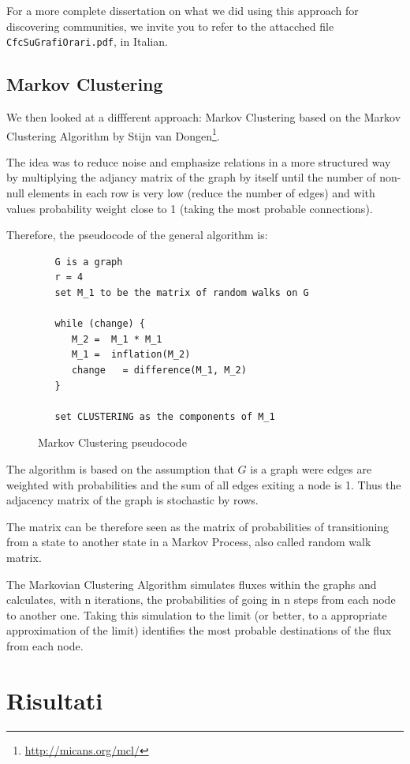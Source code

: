 \documentclass[12pt,a4paper]{article}
\begin{document}
For a more complete dissertation on what we did using this approach for discovering communities, we invite you to refer to the attacched file \texttt{CfcSuGrafiOrari.pdf}, in Italian.

\subsection{Markov Clustering}

We then looked at a diffferent approach: Markov Clustering based on the Markov Clustering Algorithm by Stijn van Dongen\footnote{\url{http://micans.org/mcl/}}.

The idea was to reduce noise and emphasize relations in a more structured way
by multiplying the adjancy matrix of the graph by itself until the number of
non-null elements in each row is very low (reduce the number of edges) and with
values probability weight close to 1 (taking the most probable connections).

Therefore, the pseudocode of the general algorithm is:
\begin{figure}
\begin{verbatim}
   G is a graph
   r = 4
   set M_1 to be the matrix of random walks on G

   while (change) {
      M_2 =  M_1 * M_1
      M_1 =  inflation(M_2)
      change   = difference(M_1, M_2)
   }

   set CLUSTERING as the components of M_1
\end{verbatim}
\caption{Markov Clustering pseudocode}
\end{figure}

The algorithm is based on the assumption that $G$ is a graph
were edges are weighted with probabilities and the sum
of all edges exiting a node is 1. Thus the adjacency matrix
of the graph is stochastic by rows.

The matrix can be therefore seen as the matrix of probabilities
of transitioning from a state to another state in
a Markov Process, also called random walk matrix.

The Markovian Clustering Algorithm simulates fluxes within the
graphs and calculates, with n iterations, the probabilities of going in
n steps from each node to another one. Taking this simulation to the limit
(or better, to a appropriate approximation of the limit) identifies
the most probable destinations of the flux from each node.



\section{Risultati}
\label{results}
\end{document}
